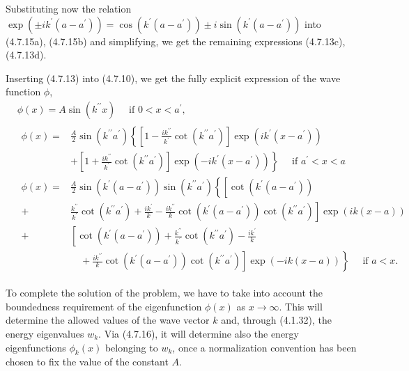 \documentclass{article}
\begin{document}
Substituting now the relation $\exp \left( \pm i k^{\prime}\left(a-a^{\prime}\right)\right)=\cos \left(k^{\prime}\left(a-a^{\prime}\right)\right) \pm i \sin \left(k^{\prime}\left(a-a^{\prime}\right)\right)$ into (4.7.15a), (4.7.15b) and simplifying, we get the remaining expressions (4.7.13c), (4.7.13d).

Inserting (4.7.13) into (4.7.10), we get the fully explicit expression of the wave function $\phi$,
$$
\begin{align*}
& \phi(x)= A \sin \left(k^{\prime \prime} x\right) \quad \text { if } 0<x<a^{\prime},  \tag{4.7.16a}\\
& \begin{align*}
\phi(x)= & \frac{A}{2} \sin \left(k^{\prime \prime} a^{\prime}\right)\left\{\left[1-\frac{i k^{\prime \prime}}{k^{\prime}} \cot \left(k^{\prime \prime} a^{\prime}\right)\right] \exp \left(i k^{\prime}\left(x-a^{\prime}\right)\right)\right. \\
& \left.+\left[1+\frac{i k^{\prime \prime}}{k^{\prime}} \cot \left(k^{\prime \prime} a^{\prime}\right)\right] \exp \left(-i k^{\prime}\left(x-a^{\prime}\right)\right)\right\} \quad \text { if } a^{\prime}<x<a \\
\phi(x)= & \frac{A}{2} \sin \left(k^{\prime}\left(a-a^{\prime}\right)\right) \sin \left(k^{\prime \prime} a^{\prime}\right)\left\{\left[\cot \left(k^{\prime}\left(a-a^{\prime}\right)\right)\right.\right. \\
+ & \left.\frac{k^{\prime \prime}}{k^{\prime}} \cot \left(k^{\prime \prime} a^{\prime}\right)+\frac{i k^{\prime}}{k}-\frac{i k^{\prime \prime}}{k} \cot \left(k^{\prime}\left(a-a^{\prime}\right)\right) \cot \left(k^{\prime \prime} a^{\prime}\right)\right] \exp (i k(x-a)) \\
+ & {\left[\cot \left(k^{\prime}\left(a-a^{\prime}\right)\right)+\frac{k^{\prime \prime}}{k^{\prime}} \cot \left(k^{\prime \prime} a^{\prime}\right)-\frac{i k^{\prime}}{k}\right.} \\
& \left.\left.\quad+\frac{i k^{\prime \prime}}{k} \cot \left(k^{\prime}\left(a-a^{\prime}\right)\right) \cot \left(k^{\prime \prime} a^{\prime}\right)\right] \exp (-i k(x-a))\right\} \quad \text { if } a<x .
\end{align*} \tag{4.7.16b}
\end{align*}
$$

To complete the solution of the problem, we have to take into account the boundedness requirement of the eigenfunction $\phi(x)$ as $x \rightarrow \infty$. This will determine the allowed values of the wave vector $k$ and, through (4.1.32), the energy eigenvalues $w_{k}$. Via (4.7.16), it will determine also the energy eigenfunctions $\phi_{k}(x)$ belonging to $w_{k}$, once a normalization convention has been chosen to fix the value of the constant $A$.
\end{document}
